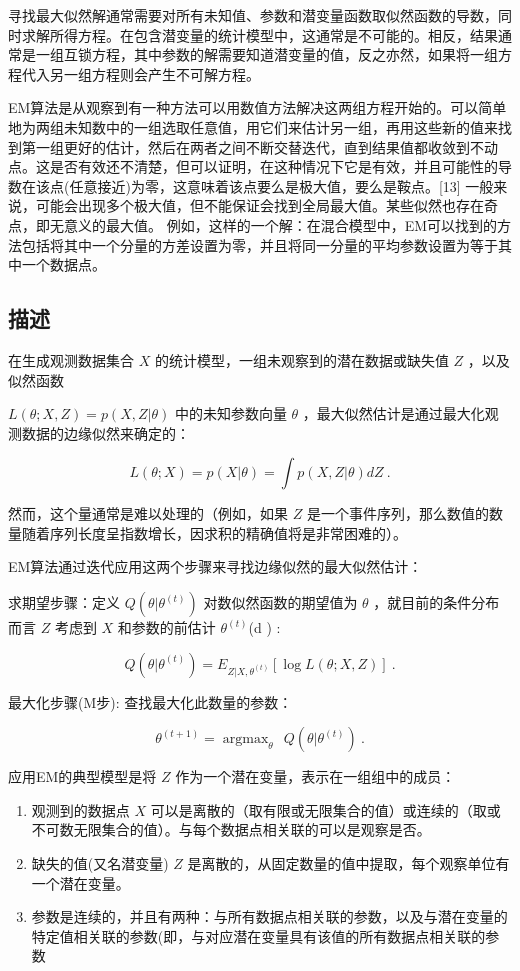 寻找最大似然解通常需要对所有未知值、参数和潜变量函数取似然函数的导数，同时求解所得方程。在包含潜变量的统计模型中，这通常是不可能的。相反，结果通常是一组互锁方程，其中参数的解需要知道潜变量的值，反之亦然，如果将一组方程代入另一组方程则会产生不可解方程。

EM算法是从观察到有一种方法可以用数值方法解决这两组方程开始的。可以简单地为两组未知数中的一组选取任意值，用它们来估计另一组，再用这些新的值来找到第一组更好的估计，然后在两者之间不断交替迭代，直到结果值都收敛到不动点。这是否有效还不清楚，但可以证明，在这种情况下它是有效，并且可能性的导数在该点(任意接近)为零，这意味着该点要么是极大值，要么是鞍点。[13] 一般来说，可能会出现多个极大值，但不能保证会找到全局最大值。某些似然也存在奇点，即无意义的最大值。 例如，这样的一个解：在混合模型中，EM可以找到的方法包括将其中一个分量的方差设置为零，并且将同一分量的平均参数设置为等于其中一个数据点。

\subsection{描述}

在生成观测数据集合 $X$ 的统计模型，一组未观察到的潜在数据或缺失值 $Z$ ，以及似然函数 

$L(\theta; X, Z) = p(X, Z | \theta)$
中的未知参数向量 $\theta$ ，最大似然估计是通过最大化观测数据的边缘似然来确定的：

$$L(\theta; X) = p(X | \theta) = \int p(X, Z | \theta) dZ~.$$

然而，这个量通常是难以处理的（例如，如果 $Z$ 是一个事件序列，那么数值的数量随着序列长度呈指数增长，因求积的精确值将是非常困难的）。

EM算法通过迭代应用这两个步骤来寻找边缘似然的最大似然估计：

求期望步骤：定义 $Q(\theta | \theta^{(t)})$ 对数似然函数的期望值为 $\theta$ ，就目前的条件分布而言 $Z$ 考虑到 $X$ 和参数的前估计 $\theta^{(t)}$(d ) :

$$Q(\theta | \theta^{(t)}) = E_{Z|X,\theta^{(t)}} [\log L(\theta; X, Z)]~.$$

最大化步骤(M步): 查找最大化此数量的参数：

$$\displaystyle \theta^{(t+1)} = \mathop{\arg \max}_{\theta}\ \ Q(\theta | \theta^{(t)})~.$$

应用EM的典型模型是将 $Z$ 作为一个潜在变量，表示在一组组中的成员：

\begin{enumerate}
\item 观测到的数据点 $X$ 可以是离散的（取有限或无限集合的值）或连续的（取或不可数无限集合的值）。与每个数据点相关联的可以是观察是否。
\item 缺失的值(又名潜变量) $Z$ 是离散的，从固定数量的值中提取，每个观察单位有一个潜在变量。
\item 参数是连续的，并且有两种：与所有数据点相关联的参数，以及与潜在变量的特定值相关联的参数(即，与对应潜在变量具有该值的所有数据点相关联的参数
\end{enumerate}

